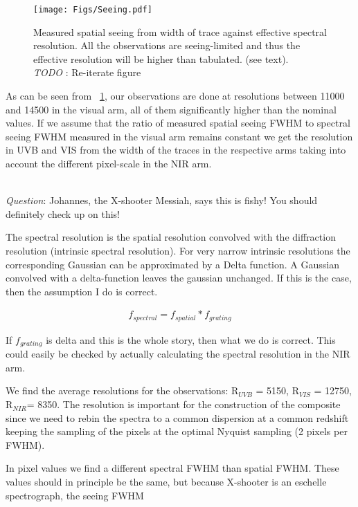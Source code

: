 \documentclass{aa}    %
\newcommand{\figref}[1]{\ref{fig:#1}}
\newcommand{\Fig}[1]{\figurename~\figref{#1}}
\newcommand{\fig}[1]{\Fig{#1}}
\newcommand{\figlabel}[1]{\label{fig:#1}}
\newcommand{\todo}[3]{{\color{#2}\emph{#1}: #3}}
\newcommand{\jstodo}[1]{\todo{ \\TODO }{red}{#1}}
\newcommand{\qtodo}[1]{\todo{\\ Question}{red}{#1}}
\begin{document}
\begin{figure}[hbtp]
  \centering
  \texttt{[image: Figs/Seeing.pdf]}
  \caption[]{Measured spatial seeing from width of trace against effective spectral resolution. All the observations are seeing-limited and thus the effective resolution will be higher than tabulated. (see text). \jstodo{Re-iterate figure} }
\figlabel{seeing}
\end{figure}



As can be seen from \fig{seeing}, our observations are done at resolutions between 11000 and 14500 in the visual arm, all of them significantly higher than the nominal values. If we assume that the ratio of measured spatial seeing FWHM to spectral seeing FWHM measured in the visual arm remains constant we get the resolution in UVB and VIS from the width of the traces in the respective arms taking into account the different pixel-scale in the NIR arm. 

\qtodo{Johannes, the X-shooter Messiah, says this is fishy! You should definitely check up on this!}

The spectral resolution is the spatial resolution convolved with the diffraction resolution (intrinsic spectral resolution). For very narrow intrinsic resolutions the corresponding Gaussian can be approximated by a Delta function. A Gaussian convolved with a delta-function leaves the gaussian unchanged. If this is the case, then the assumption I do is correct. 

\begin{eqnarray}
f_{spectral} = f_{spatial} \ast f_{grating}
\end{eqnarray}

If $f_{grating}$ is delta and this is the whole story, then what we do is correct. This could easily be checked by actually calculating the spectral resolution in the NIR arm.  


We find the average resolutions for the observations: R$_{UVB}$ = 5150, R$_{VIS}$ = 12750, R$_{NIR}$= 8350. The resolution is important for the construction of the composite since we need to rebin the spectra to a common dispersion at a common redshift keeping the sampling of the pixels at the optimal Nyquist sampling (2 pixels per FWHM). 

In pixel values we find a different spectral FWHM than spatial FWHM. These values should in principle be the same, but because X-shooter is an eschelle spectrograph, the seeing FWHM
\end{document}
